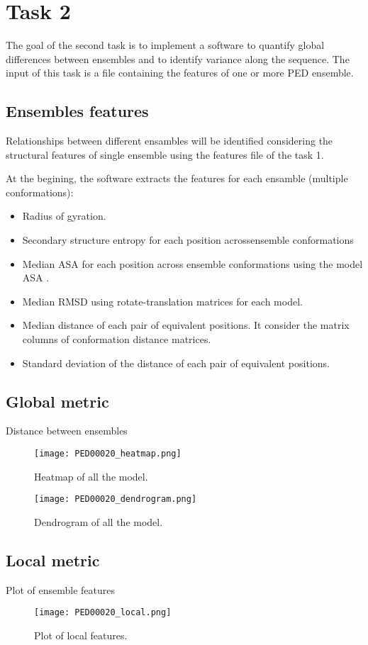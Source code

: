 \section{Task 2}\label{sec:task2}

The goal of the second task is to implement a software to quantify global differences between ensembles and to identify variance along the sequence. The input of this task is a file containing the features of one or more PED ensemble.

\subsection{Ensembles features}
Relationships between different ensambles will be identified considering the structural features of single ensemble using the features file of the task 1.

At the begining, the software extracts the features for each ensamble (multiple conformations):
\begin{itemize}
\item Radius of gyration.
\item Secondary structure entropy for each position acrossensemble conformations
\item Median ASA for each position across ensemble conformations using the model ASA .
\item Median RMSD using rotate-translation matrices for each model.
\item Median distance of each pair of equivalent positions. It consider the matrix columns of conformation distance matrices.
\item Standard deviation of the distance of each pair of equivalent positions.
\end{itemize}


\subsection{Global metric}

Distance between ensembles
\begin{figure}[H]
	\begin{minipage}[b]{0.9\textwidth}
		\centering
		\texttt{[image: PED00020\_heatmap.png]}
		\caption{Heatmap of all the model.}
		\label{heatmap}
	\end{minipage}
	\hfill
	\begin{minipage}[b]{0.9\textwidth}
		\centering
		\texttt{[image: PED00020\_dendrogram.png]}
		\caption{Dendrogram of all the model.}
		\label{dendrogram}
	\end{minipage}
\end{figure}



\subsection{Local metric}
Plot of ensemble features
\begin{figure}[H]
	\begin{minipage}[b]{0.9\textwidth}
		\centering
		\texttt{[image: PED00020\_local.png]}
		\caption{Plot of local features.}
		\label{plot}
	\end{minipage}	
\end{figure}